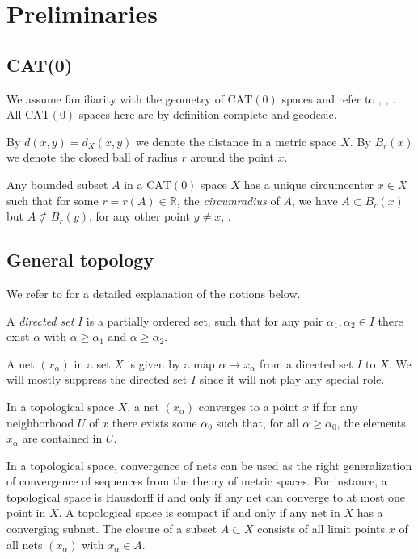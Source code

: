 \documentclass[12pt,leqno]{amsart}
\numberwithin{equation}{section}
\theoremstyle{remark}
\newcommand{\CAT}{\mathrm{CAT}}
\newcommand{\R}{\mathbb{R}}
\begin{document}
\section{Preliminaries} \label{sec: prel}

\subsection{CAT(0)}
We assume familiarity with the geometry of $\CAT(0)$ spaces and refer to \cite{BH}, \cite{AKP}, \cite{AKP_inv}. 
All $\CAT(0)$ spaces here are by definition complete and geodesic.

By $d(x,y)=d_X(x,y)$ we denote the distance in a metric space $X$.
By $B_r(x)$ we denote the closed ball of radius $r$ around the point $x$.

Any bounded subset $A$ in a $\CAT(0)$ space $X$ has a unique circumcenter $x\in X$ such that 
for some $r=r(A)\in \R$, the \emph{circumradius} of $A$, we have $A\subset B_r(x)$ but $A\not\subset B_r(y)$,
for any other point $y\neq x$, \cite{BH}.

\subsection{General topology}
We refer to \cite{Engel} for a detailed explanation of the notions below.

A \emph{directed set} $I$ is a partially ordered set, such that for any pair $\alpha_1, \alpha_2 \in I$ there exist
$\alpha$ with $\alpha \geq \alpha _1$ and $\alpha \geq \alpha _2$.

A net $(x_{\alpha})$ in a set $X$ is given by a map $\alpha \to x_{\alpha}$ from a directed set $I$ to $X$.
We will mostly suppress the directed set $I$ since it will not play any special role.

In a topological space $X$, a net $(x_{\alpha})$ converges to a point $x$ if for any neighborhood $U$ of $x$
there exists some $\alpha _0$ such that, for all $\alpha \geq \alpha _0$, the elements $x_{\alpha}$ are contained in $U$.

In a topological space, convergence of nets can be used as the right generalization of convergence of sequences from the theory of metric spaces.
For instance, a topological space is Hausdorff if and only if any net can converge to at most one point in $X$.
A topological space is compact if and only if any net in $X$ has a converging subnet.
The closure of a subset $A\subset X$ consists of all limit points $x$ of all nets $(x_{\alpha})$ with $x_{\alpha} \in A$. 
\end{document}

